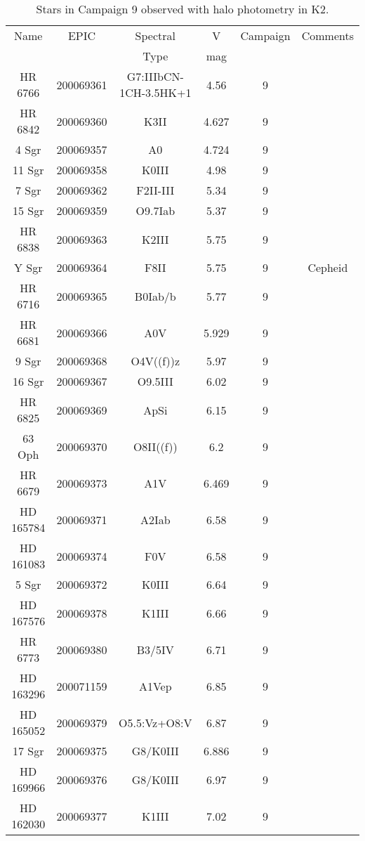 \begin{table*}
\caption{Stars in Campaign 9 observed with halo photometry in K2.\label{table_1}}
\begin{tabular}{cccccc}
\hline \hline
Name & EPIC & Spectral & V & Campaign & Comments \\
 &  & Type & mag &  &  \\
\hline
HR 6766 & 200069361 & G7:IIIbCN-1CH-3.5HK+1 & 4.56 & 9 &  \\
HR 6842 & 200069360 & K3II & 4.627 & 9 &  \\
4 Sgr & 200069357 & A0 & 4.724 & 9 &  \\
11 Sgr & 200069358 & K0III & 4.98 & 9 &  \\
7 Sgr & 200069362 & F2II-III & 5.34 & 9 &  \\
15 Sgr & 200069359 & O9.7Iab & 5.37 & 9 &  \\
HR 6838 & 200069363 & K2III & 5.75 & 9 &  \\
Y Sgr & 200069364 & F8II & 5.75 & 9 & Cepheid \\
HR 6716 & 200069365 & B0Iab/b & 5.77 & 9 &  \\
HR 6681 & 200069366 & A0V & 5.929 & 9 &  \\
9 Sgr & 200069368 & O4V((f))z & 5.97 & 9 &  \\
16 Sgr & 200069367 & O9.5III & 6.02 & 9 &  \\
HR 6825 & 200069369 & ApSi & 6.15 & 9 &  \\
63 Oph & 200069370 & O8II((f)) & 6.2 & 9 &  \\
HR 6679 & 200069373 & A1V & 6.469 & 9 &  \\
HD 165784 & 200069371 & A2Iab & 6.58 & 9 &  \\
HD 161083 & 200069374 & F0V & 6.58 & 9 &  \\
5 Sgr & 200069372 & K0III & 6.64 & 9 &  \\
HD 167576 & 200069378 & K1III & 6.66 & 9 &  \\
HR 6773 & 200069380 & B3/5IV & 6.71 & 9 &  \\
HD 163296 & 200071159 & A1Vep & 6.85 & 9 &  \\
HD 165052 & 200069379 & O5.5:Vz+O8:V & 6.87 & 9 &  \\
17 Sgr & 200069375 & G8/K0III & 6.886 & 9 &  \\
HD 169966 & 200069376 & G8/K0III & 6.97 & 9 &  \\
HD 162030 & 200069377 & K1III & 7.02 & 9 &  \\
\hline
\end{tabular}
\end{table*}
